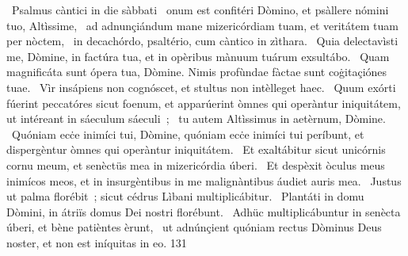 {~Psalmus càntici in die sàbbati}
{%
~onum est confitéri Dòmino, et psàllere nómini tuo, Altìssime,
~ad adnunçiándum mane mizericórdiam tuam, et veritátem tuam per nòctem,
~in decachórdo, psaltério, cum càntico in zìthara.
~Quia delectavìsti me, Dòmine, in factúra tua, et in opèribus mànuum tuárum exsultábo.
~Quam magnificáta sunt ópera tua, Dòmine. Nimis profùndae fàctae sunt coġitaçiónes tuae.
~Vìr insápiens non cognóscet, et stultus non intèlleget haec.
~Quum exórti fúerint peccatóres sicut foenum, et apparúerint òmnes qui operàntur iniquitátem, ut intéreant in sáeculum sáeculi~;
~tu autem Altìssimus in aetèrnum, Dòmine.
~Quóniam ecċe inimíci tui, Dòmine, quóniam ecċe inimíci tui períbunt, et dispergèntur òmnes qui operàntur iniquitátem.
~Et exaltábitur sicut unicórnis cornu meum, et senèctüs mea in mizericórdia úberi.
~Et despèxit òculus meus inimícos meos, et in insurgèntibus in me malignàntibus áudiet auris mea.
~Justus ut palma florébit~; sicut cédrus Lìbani multiplicábitur.
~Plantáti in domu Dòmini, in átriïs domus Dei nostri florébunt.
~Adhüc multiplicábuntur in senècta úberi, et bène patièntes èrunt,
~ut adnúnçient quóniam rectus Dòminus Deus noster, et non est iníquitas in eo.}
{13}{1}
